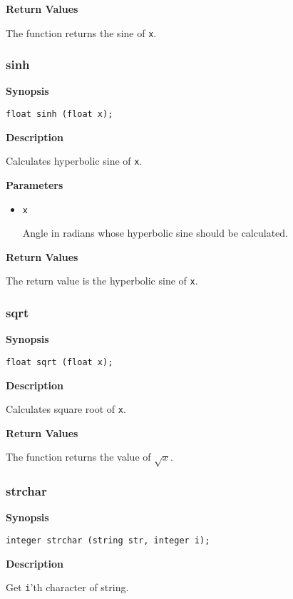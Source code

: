 \documentclass[a4paper, 10pt, titlepage]{article}
\begin{document}
\textbf{Return Values}

The function returns the sine of \texttt{x}.

\subsubsection{sinh}

\textbf{Synopsis}

\begin{verbatim}
float sinh (float x);
\end{verbatim}

\textbf{Description}

Calculates hyperbolic sine of \texttt{x}.

\textbf{Parameters}

\begin{itemize}
\item \texttt{x}

Angle in radians whose hyperbolic sine should be calculated.
\end{itemize}

\textbf{Return Values}

The return value is the hyperbolic sine of \texttt{x}.

\subsubsection{sqrt}

\textbf{Synopsis}

\begin{verbatim}
float sqrt (float x);
\end{verbatim}

\textbf{Description}

Calculates square root of \texttt{x}.

\textbf{Return Values}

The function returns the value of $\sqrt{x}$.

\subsubsection{strchar}

\textbf{Synopsis}

\begin{verbatim}
integer strchar (string str, integer i);
\end{verbatim}

\textbf{Description}

Get \texttt{i}'th character of string.
\end{document}
